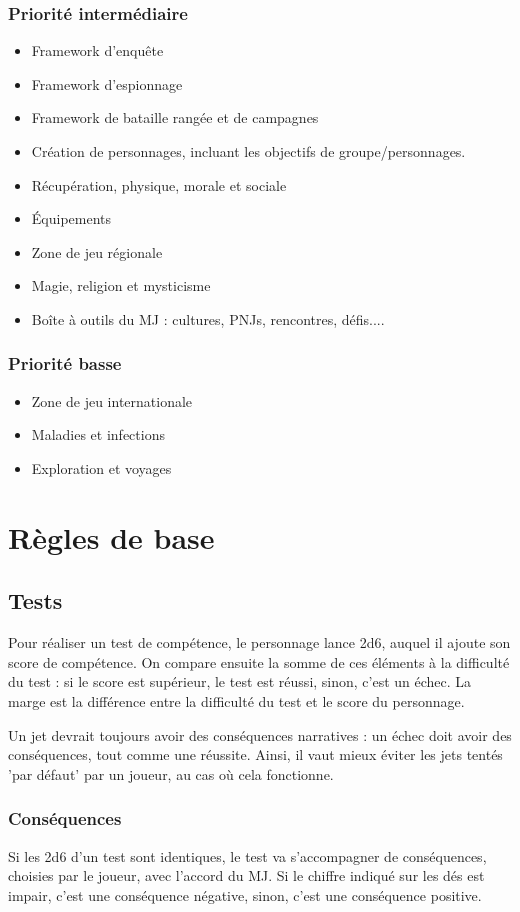 \documentclass[10pt,a4paper]{book}
\begin{document}
\subsection*{Priorité intermédiaire}
\begin{itemize}
\item Framework d'enquête
\item Framework d'espionnage
\item Framework de bataille rangée et de campagnes
\item Création de personnages, incluant les objectifs de groupe/personnages.
\item Récupération, physique, morale et sociale
\item Équipements
\item Zone de jeu régionale
\item Magie, religion et mysticisme
\item Boîte à outils du MJ : cultures, PNJs, rencontres, défis....
\end{itemize}
\subsection*{Priorité basse}
\begin{itemize}
\item Zone de jeu internationale
\item Maladies et infections
\item Exploration et voyages
\end{itemize}
\chapter{Règles de base}
\section{Tests}
Pour réaliser un test de compétence, le personnage lance 2d6, auquel il ajoute son score de compétence. On compare ensuite la somme de ces éléments à la difficulté du test : si le score est supérieur, le test est réussi, sinon, c'est un échec. La marge est la différence entre la difficulté du test et le score du personnage.

Un jet devrait toujours avoir des conséquences narratives : un échec doit avoir des conséquences, tout comme une réussite. Ainsi, il vaut mieux éviter les jets tentés 'par défaut' par un joueur, au cas où cela fonctionne.

\subsection{Conséquences}
Si les 2d6 d'un test sont identiques, le test va s'accompagner de conséquences, choisies par le joueur, avec l'accord du MJ. Si le chiffre indiqué sur les dés est impair, c'est une conséquence négative, sinon, c'est une conséquence positive.
\end{document}
